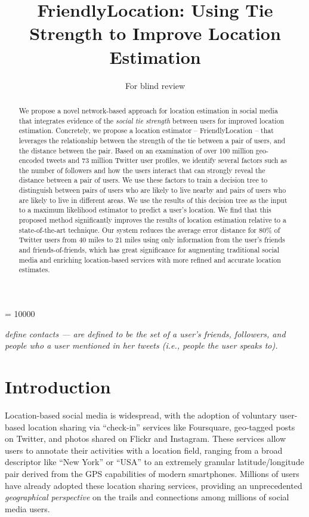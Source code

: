 \documentclass{sig-alternate}
\newcommand{\jam}[1]{\emph{#1}}
\begin{document}
 {}
\crdata{}
\widowpenalty = 10000

\author{
\alignauthor
For blind review
}

\title{FriendlyLocation: Using Tie Strength to Improve Location Estimation}

\maketitle
\begin{abstract}
We propose a novel network-based approach for location estimation in social
media that integrates evidence of the \textit{social tie strength} between
users for improved location estimation.
%
Concretely, we propose a location
estimator -- FriendlyLocation -- that leverages the relationship between the
strength of the tie between a pair of users, and the distance between the pair.
%
Based on an examination of over 100 million geo-encoded tweets and 73 million
Twitter user profiles, we identify several factors such as the
number of followers and how the users interact that can strongly reveal the
distance between a pair of users.
%
We use these factors to train a decision
tree to distinguish between pairs of users who are likely to live nearby and pairs of
users who are likely to live in different areas.
%
We use the results of this decision tree as the input to a maximum likelihood
estimator to predict a user's location.
We find that this proposed method significantly improves the results of
location estimation relative to a state-of-the-art technique.
Our system reduces the average error distance for 80\% of Twitter users from 40
miles to 21 miles using only information from the user's friends and
friends-of-friends,  which has great significance for augmenting traditional
social media and enriching location-based services with more refined and
accurate location estimates.
%
\end{abstract}

\jam{define contacts --- are defined to be the set of a user's friends, followers, and
people who a user mentioned in her tweets (i.e., people the user speaks to).}

\section{Introduction}
Location-based social media is widespread, with the adoption of voluntary
user-based location sharing via ``check-in'' services like Foursquare,
geo-tagged posts on Twitter, and photos shared on Flickr and Instagram.
%
These services allow users to annotate their activities with a location field,
ranging from a broad descriptor like ``New York'' or ``USA'' to an extremely
granular latitude/longitude pair  derived from the GPS capabilities of modern
smartphones.
%
Millions of users have already adopted these location sharing services,
providing an unprecedented \textit{geographical perspective} on the trails and
connections among millions of social media users.
\end{document}
